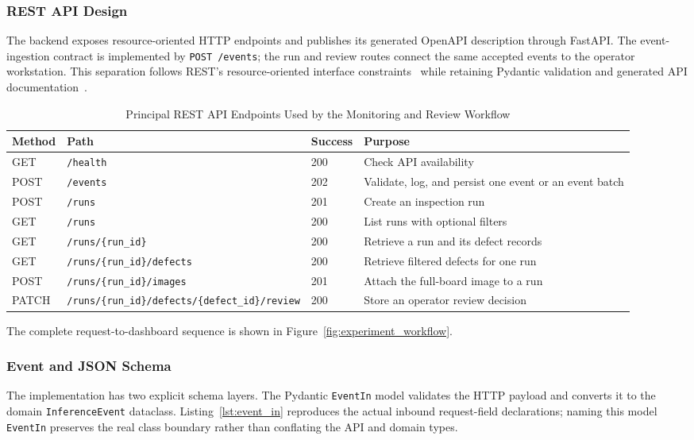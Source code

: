 \documentclass[12pt,a4paper]{article}
\begin{document}
\subsubsection{REST API Design}
The backend exposes resource-oriented HTTP endpoints and publishes its generated
OpenAPI description through FastAPI. The event-ingestion contract is implemented
by \texttt{POST /events}; the run and
review routes connect the same accepted events to the operator workstation. This
separation follows REST's resource-oriented interface constraints~\cite{fielding2000rest}
while retaining Pydantic validation and generated API documentation~\cite{fastapi}.

\begin{table}[!ht]
\centering
\small
\caption{Principal REST API Endpoints Used by the Monitoring and Review Workflow}
\label{tab:api_endpoints}
\begin{tabular}{p{} p{} p{} p{}}
\toprule
\textbf{Method} & \textbf{Path} & \textbf{Success} & \textbf{Purpose} \\
\midrule
GET & \texttt{/health} & 200 & Check API availability \\
POST & \texttt{/events} & 202 & Validate, log, and persist one event or an event batch \\
POST & \texttt{/runs} & 201 & Create an inspection run \\
GET & \texttt{/runs} & 200 & List runs with optional filters \\
GET & \texttt{/runs/\{run\_id\}} & 200 & Retrieve a run and its defect records \\
GET & \texttt{/runs/\{run\_id\}/defects} & 200 & Retrieve filtered defects for one run \\
POST & \texttt{/runs/\{run\_id\}/images} & 201 & Attach the full-board image to a run \\
PATCH & \texttt{/runs/\{run\_id\}/}\newline\texttt{defects/\{defect\_id\}/review} & 200 & Store an operator review decision \\
\bottomrule
\end{tabular}
\end{table}

The complete request-to-dashboard sequence is shown in
Figure~\ref{fig:experiment_workflow}.

\subsubsection{Event and JSON Schema}
The implementation has two explicit schema layers. The Pydantic
\texttt{EventIn} model validates the HTTP payload and converts it to the domain
\texttt{InferenceEvent} dataclass. Listing~\ref{lst:event_in} reproduces the
actual inbound request-field declarations; naming this model \texttt{EventIn}
preserves the real class boundary rather than conflating the API and domain
types.
\end{document}
